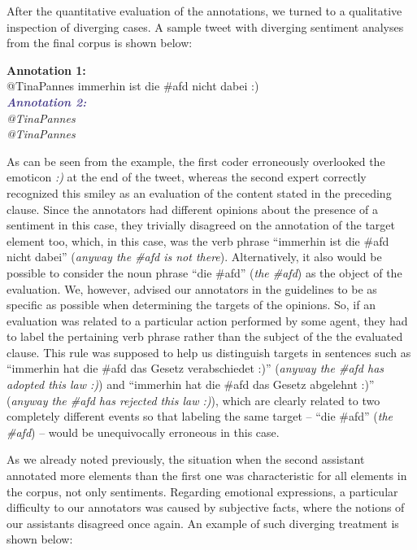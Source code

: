 After the quantitative evaluation of the annotations, we turned to a
qualitative inspection of diverging cases.  A sample tweet with
diverging sentiment analyses from the final corpus is shown below:
\begin{example}\label{snt:exmp:sent-disagr}
  \textcolor{red3}{\textbf{Annotation 1:}}\\ \upshape{}@TinaPannes
  immerhin ist die \#afd nicht dabei :)\\[0.8em]\itshape
  \noindent\textcolor{darkslateblue}{\textbf{\itshape Annotation
      2:}}\\ \upshape{}@TinaPannes
  \sentiment{\textcolor{red}{immerhin ist die \#afd nicht
      dabei :)}}\\[0.8em]
  \noindent\itshape{}@TinaPannes
  \upshape{}
\end{example}
As can be seen from the example, the first coder erroneously
overlooked the emoticon \emph{:)} at the end of the tweet, whereas the
second expert correctly recognized this smiley as an evaluation of the
content stated in the preceding clause.  Since the annotators had
different opinions about the presence of a sentiment in this case,
they trivially disagreed on the annotation of the target element too,
which, in this case, was the verb phrase ``immerhin ist die \#afd
nicht dabei'' (\emph{anyway the \#afd is not there}).  Alternatively,
it also would be possible to consider the noun phrase ``die \#afd''
(\emph{the \#afd}) as the object of the evaluation.  We, however,
advised our annotators in the guidelines to be as specific as possible
when determining the targets of the opinions. So, if an evaluation was
related to a particular action performed by some agent, they had to
label the pertaining verb phrase rather than the subject of the the
evaluated clause.  This rule was supposed to help us distinguish
targets in sentences such as ``immerhin hat die \#afd das Gesetz
verabschiedet :)'' (\emph{anyway the \#afd has adopted this law :)})
and ``immerhin hat die \#afd das Gesetz abgelehnt :)'' (\emph{anyway
  the \#afd has rejected this law :)}), which are clearly related to
two completely different events so that labeling the same target --
``die \#afd'' (\emph{the \#afd}) -- would be unequivocally erroneous
in this case.


As we already noted previously, the situation when the second
assistant annotated more elements than the first one was
characteristic for all elements in the corpus, not only sentiments.
Regarding emotional expressions, a particular difficulty to our
annotators was caused by subjective facts, where the notions of our
assistants disagreed once again.  An example of such diverging
treatment is shown below:


